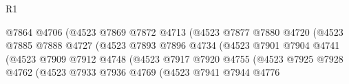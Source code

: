 \begin{lexlean}{R1}
\begin{coremodule}
                                              @7864
                                              @4706
                                              (@4523
                                                @7869
                                                @7872
                                                @4713
                                                (@4523
                                                  @7877
                                                  @7880
                                                  @4720
                                                  (@4523
                                                    @7885
                                                    @7888
                                                    @4727
                                                    (@4523
                                                      @7893
                                                      @7896
                                                      @4734
                                                      (@4523
                                                        @7901
                                                        @7904
                                                        @4741
                                                        (@4523
                                                          @7909
                                                          @7912
                                                          @4748
                                                          (@4523
                                                            @7917
                                                            @7920
                                                            @4755
                                                            (@4523
                                                              @7925
                                                              @7928
                                                              @4762
                                                              (@4523
                                                                @7933
                                                                @7936
                                                                @4769
                                                                (@4523
                                                                  @7941
                                                                  @7944
                                                                  @4776

\end{coremodule}
\end{lexlean}
